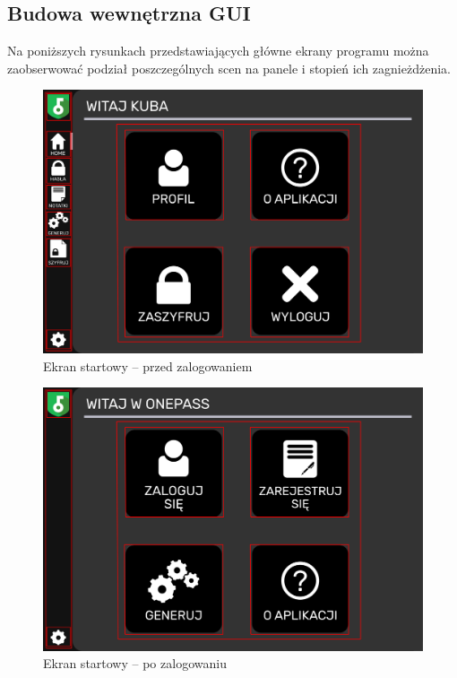 \documentclass[a4paper]{article}
\begin{document}
\subsection{Budowa wewnętrzna GUI}
Na poniższych rysunkach przedstawiających główne ekrany programu można zaobserwować podział poszczególnych scen na panele i stopień ich zagnieżdżenia.
\begin{figure}[H]
    \centering
    \includegraphics[width=1\textwidth]{img/ekran_przed_zalogowanie.png}
    \caption{Ekran startowy -- przed zalogowaniem}
    \label{fig:startPrzed}
\end{figure}

\begin{figure}[H]
    \centering
    \includegraphics[width=1\textwidth]{img/ekran_po_zalogowanie.png}
    \caption{Ekran startowy -- po zalogowaniu}
    \label{fig:startPo}
\end{figure}
\end{document}
